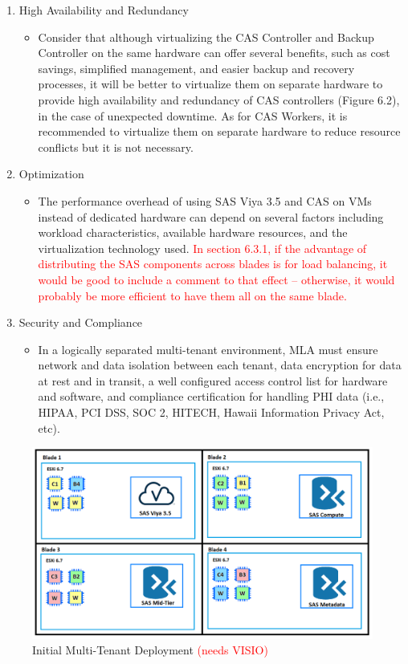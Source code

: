 \begin{enumerate}
    \item High Availability and Redundancy
    \begin{itemize}
        \item Consider that although virtualizing the CAS Controller and Backup Controller on the same hardware can offer several benefits, such as cost savings, simplified management, and easier backup and recovery processes, it will be better to virtualize them on separate hardware to provide high availability and redundancy of CAS controllers (Figure 6.2), in the case of unexpected downtime. As for CAS Workers, it is recommended to virtualize them on separate hardware to reduce resource conflicts but it is not necessary. 
    \end{itemize}
    \item Optimization
    \begin{itemize}
        \item The performance overhead of using SAS Viya 3.5 and CAS on VMs instead of dedicated hardware can depend on several factors including workload characteristics, available hardware resources, and the virtualization technology used.
        \textcolor{red}{In section 6.3.1, if the advantage of distributing the SAS components across blades is for load balancing, it would be good to include a comment to that effect -- otherwise, it would probably be more efficient to have them all on the same blade.}
    \end{itemize}
    \item Security and Compliance
    \begin{itemize}
        \item In a logically separated multi-tenant environment, MLA must ensure network and data isolation between each tenant, data encryption for data at rest and in transit, a well configured access control list for hardware and software, and compliance certification for handling PHI data (i.e., HIPAA, PCI DSS, SOC 2, HITECH, Hawaii Information Privacy Act, etc). 

    \end{itemize}
\end{enumerate}
\fi

\begin{figure}[H]
    \centering
    \includegraphics[scale = 0.52]{images/initial-deployment-diagram.png}
    \caption{Initial Multi-Tenant Deployment \textcolor{red}{(needs VISIO)} }
    \label{Initial Multi-Tenant Deployment}
\end{figure} 

